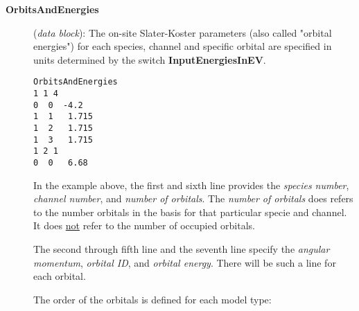 \begin{description}
\item[{\bf OrbitsAndEnergies}] ({\it data block}):
 The on-site
Slater-Koster parameters (also called "orbital energies") for each
species, channel and specific orbital are specified in units
determined by the switch {\bf InputEnergiesInEV}.

\begin{verbatim}
OrbitsAndEnergies
1 1 4
0  0  -4.2
1  1   1.715
1  2   1.715
1  3   1.715
1 2 1
0  0   6.68
\end{verbatim}

In the example above, the first and sixth line provides the {\it
species number}, {\it channel number}, and {\it number of
orbitals}. The {\it number of orbitals} does refers to the number
orbitals in the basis for that particular specie and channel.  It
does \underline{not} refer to the number of occupied orbitals.

The second through fifth line and the seventh line specify the
{\it angular momentum}, {\it orbital ID}, and {\it orbital
energy}. There will be such a line for each orbital.

The order of the orbitals is defined for each model type:


\end{description}
